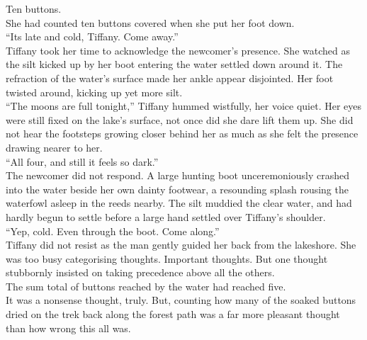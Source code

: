Ten buttons.\\

She had counted ten buttons covered when she put her foot down.\\

``Its late and cold, Tiffany. Come away.''\\

Tiffany took her time to acknowledge the newcomer's presence. 
She watched as the silt kicked up by her boot entering the water settled down around it.
The refraction of the water's surface made her ankle appear disjointed. 
Her foot twisted around, kicking up yet more silt.\\

``The moons are full tonight,'' Tiffany hummed wistfully, her voice quiet. 
Her eyes were still fixed on the lake's surface, not once did she dare lift them up. 
She did not hear the footsteps growing closer behind her as much as she felt the presence drawing nearer to her.\\

``All four, and still it feels so dark.''\\

The newcomer did not respond. 
A large hunting boot unceremoniously crashed into the water beside her own dainty footwear, a resounding splash rousing the waterfowl asleep in the reeds nearby.
The silt muddied the clear water, and had hardly begun to settle before a large hand settled over Tiffany's shoulder.\\

``Yep, cold. Even through the boot. Come along.''\\

Tiffany did not resist as the man gently guided her back from the lakeshore. 
She was too busy categorising thoughts. 
Important thoughts. 
But one thought stubbornly insisted on taking precedence above all the others.\\

The sum total of buttons reached by the water had reached five.\\

It was a nonsense thought, truly. 
But, counting how many of the soaked buttons dried on the trek back along the forest path was a far more pleasant thought than how wrong this all was.\\


